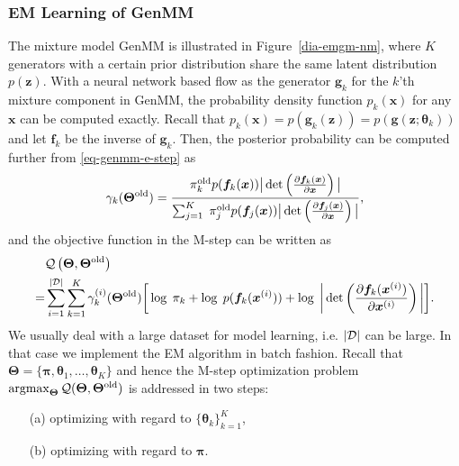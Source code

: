 \subsubsection{EM Learning of GenMM}
\label{sec-algo-genmm}
The mixture model GenMM is illustrated in Figure~\ref{dia-emgm-nm},
where $K$ generators with a certain prior distribution share the same
latent distribution $p(\bm{z})$. With a neural network based flow as the generator $\bm{g}_k$ for the $k$'th mixture component in GenMM, the probability density function $p_k(\bm{x})$ for any
$\bm{x}$ can be computed exactly. Recall that $p_k(\bm{x}) =  p(\bm{g}_k(\bm{z})) =p(\bm{g}(\bm{z};\bm{\theta}_k))$ and let $\bm{f}_k$ be the inverse of $\bm{g}_k$. Then, the posterior probability can be computed further from \eqref{eq-genmm-e-step} as
\begin{align}\label{eq-genmm-gamma}
  \gamma_k({\bm{\Theta}}^{\mathrm{old}}) = \frac{\pi_k^{\mathrm{old}} p(\bm{f}_k(\bm{x})) \big|\det\left( \frac{ \partial \bm{f}_k(\bm{x})}{\partial \bm{x}} \right)\big|}{\sum_{j=1}^K\; \pi_j^{\mathrm{old}} p(\bm{f}_j(\bm{x})) \big|\det\left( \frac{ \partial \bm{f}_j(\bm{x})}{\partial \bm{x}} \right)\big|},
\end{align}
and the objective function in the M-step can be written as
\begin{align}\label{eq-genmm-obj}
  &\mathcal{Q}\left(\bm{\Theta},\bm{\Theta}^{\mathrm{old}}\right)  \nonumber\\
  =&\sum_{i=1}^{| \mathcal{D} |} \sum_{k=1}^{K}\gamma_k^{(i)}(\bm{\Theta}^{\mathrm{old}})\bigg[ \log\;\pi_k +\log\;p(\bm{f}_k(\bm{x}^{(i)})) + \log\;\bigg|\det\left(\frac{ \partial \bm{f}_k(\bm{x}^{(i)})}{\partial \bm{x}^{(i)}} \right)\bigg|\bigg].
\end{align}
We usually deal with a large dataset for model learning, i.e. $| \mathcal{D} |$ can be large. In that case we implement the EM algorithm in batch fashion. 
Recall that $ \bm{\Theta}= \{\bm{\pi},\bm{\theta}_1, \dots, \bm{\theta}_K \}$ and hence the M-step optimization problem $\operatorname{argmax}_{\bm{\Theta}} \mathcal{Q} (\bm{\Theta},\bm{\Theta}^{\mathrm{old}})$ is addressed in two steps:
\begin{itemize}
\item[(a)] optimizing with regard to $\{ \bm{\theta}_k \}_{k=1}^{K}$,
\item[(b)] optimizing with regard to $\bm{\pi}$.
\end{itemize}

